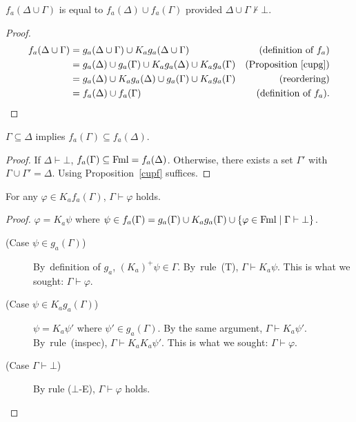 \begin{proposition}
 \label{cupf}
 $f_a(\Delta\cup \Gamma)$ is equal to
 $f_a(\Delta)\cup f_a(\Gamma)$ provided $\Delta\cup\Gamma\not\vdash\bot$.
\end{proposition}
\begin{proof}
 \begin{align*}
  f_a(\Delta\cup\Gamma)& = g_a(\Delta\cup\Gamma)\cup K_ag_a(\Delta\cup\Gamma)
  &\text{(definition of $f_a$)}\\
  &= g_a(\Delta)\cup g_a(\Gamma)\cup K_ag_a(\Delta)\cup K_ag_a(\Gamma)
  &\text{(Proposition~\ref{cupg})}\\
  &= g_a(\Delta)\cup K_ag_a(\Delta)\cup g_a(\Gamma)\cup K_ag_a(\Gamma)
  &\text{(reordering)}\\
  &= f_a(\Delta)\cup f_a(\Gamma)
  &\text{(definition of $f_a$)}.
 \end{align*}
\end{proof}

\begin{proposition}
 \label{f_mono}
 $\Gamma\subseteq \Delta$ implies $f_a(\Gamma)\subseteq f_a(\Delta)$.
\end{proposition}
\begin{proof}
 If $\Delta\vdash\bot$, $f_a(\Gamma)\subseteq \operatorname{Fml} = f_a(\Delta)$.
 Otherwise, 
 there exists a set $\Gamma'$ with $\Gamma\cup \Gamma' = \Delta$.
 Using Proposition~\ref{cupf} suffices.
\end{proof}

\begin{proposition}
 \label{wakame}
 For any $\varphi\in K_af_a(\Gamma)$, $\Gamma\vdash\varphi$ holds.
\end{proposition}
\begin{proof}
 $\varphi = K_a\psi$ where $\psi\in f_a(\Gamma) = g_a(\Gamma)\cup K_ag_a(\Gamma)\cup
 \{\varphi\in\operatorname{Fml}\mid\Gamma\vdash\bot\}$.
 \begin{description}
  \item[ (Case $\psi\in g_a(\Gamma)$)]
	     By~definition of $g_a$, $(K_a)^+\psi\in \Gamma$.
	     By~rule~(T), $\Gamma\vdash K_a\psi$.
	     This is what we sought: $\Gamma\vdash\varphi$.
  \item[ (Case $\psi\in K_ag_a(\Gamma)$)]
	     $\psi = K_a\psi'$ where $\psi'\in g_a(\Gamma)$.
	     By the same argument, $\Gamma\vdash K_a\psi'$.
	     By~rule~(inspec), $\Gamma\vdash K_aK_a\psi'$.
	     This is what we sought: $\Gamma\vdash\varphi$.
  \item[ (Case $\Gamma\vdash\bot$)]
	     By rule ($\bot$-E), $\Gamma\vdash\varphi$ holds.
 \end{description}
\end{proof}

